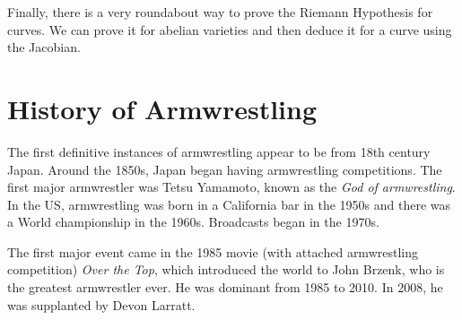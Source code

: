 \documentclass[leqno, openany]{memoir}
\theoremstyle{definition}
\theoremstyle{remark}
\theoremstyle{plain}
\theoremstyle{definition}
\theoremstyle{remark}
\begin{document}
Finally, there is a very roundabout way to prove the Riemann Hypothesis for
curves. We can prove it for abelian varieties and then deduce it for a curve
using the Jacobian.

\section{History of Armwrestling}%

The first definitive instances of armwrestling appear to be from 18th century
Japan. Around the 1850s, Japan began having armwrestling competitions. The
first major armwrestler was Tetsu Yamamoto, known as the \textit{God of
armwrestling}. In the US, armwrestling was born in a California bar in the
1950s and there was a World championship in the 1960s. Broadcasts began in the
1970s.

The first major event came in the 1985 movie (with attached armwrestling
competition) \textit{Over the Top}, which introduced the world to John Brzenk,
who is the greatest armwrestler ever. He was dominant from 1985 to 2010. In
2008, he was supplanted by Devon Larratt. 
\end{document}
